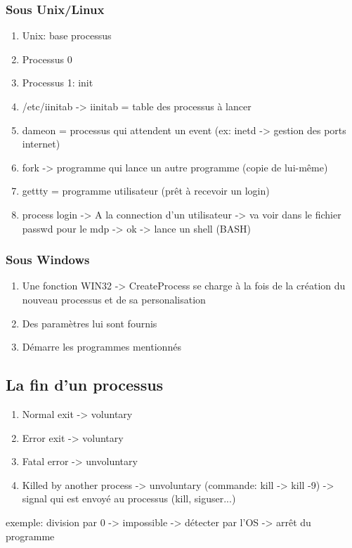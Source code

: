 \subsubsection{Sous Unix/Linux}
\begin{enumerate}
  \item Unix: base processus
  \item Processus 0
  \item Processus 1: init
  \item /etc/iinitab -> iinitab = table des processus à lancer
  \item dameon = processus qui attendent un event (ex: inetd -> gestion des ports internet)
  \item fork -> programme qui lance un autre programme (copie de lui-même)
  \item gettty = programme utilisateur (prêt à recevoir un login)
  \item process login -> A la connection d'un utilisateur -> va voir dans le fichier passwd pour le mdp -> ok -> lance un shell (BASH)
\end{enumerate}

\subsubsection{Sous Windows}
\begin{enumerate}
  \item Une fonction WIN32 -> CreateProcess se charge à la fois de la création du nouveau processus et de sa personalisation
  \item Des paramètres lui sont fournis
  \item Démarre les programmes mentionnés
\end{enumerate}

\subsection{La fin d'un processus}
\begin{enumerate}
  \item Normal exit -> voluntary
  \item Error exit -> voluntary
  \item Fatal error -> unvoluntary
  \item Killed by another process -> unvoluntary (commande: kill -> kill -9) -> signal qui est envoyé au processus (kill, siguser...)
\end{enumerate}
exemple: division par 0 -> impossible -> détecter par l'OS -> arrêt du programme

